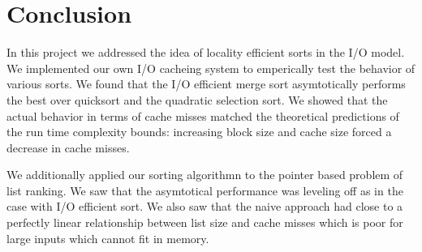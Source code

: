 \documentclass[11pt]{article}
\begin{document}
\section{Conclusion}
In this project we addressed the idea of locality efficient sorts in the I/O model.  We implemented our own I/O cacheing system to 
emperically test the behavior of various sorts.   We found that the I/O efficient merge sort asymtotically performs the best over quicksort 
and the quadratic selection sort.  We showed that the actual behavior in terms of cache misses matched the theoretical predictions of the 
run time complexity bounds: increasing block size and cache size forced a decrease in cache misses.

We additionally applied our sorting algorithmn to the pointer based problem of list ranking.  We saw that 
the asymtotical performance was leveling off as in the case with I/O efficient sort.  We also saw that the naive approach had close to a 
perfectly linear relationship between list size and cache misses which is poor for large inputs which cannot fit in memory.
\end{document}
